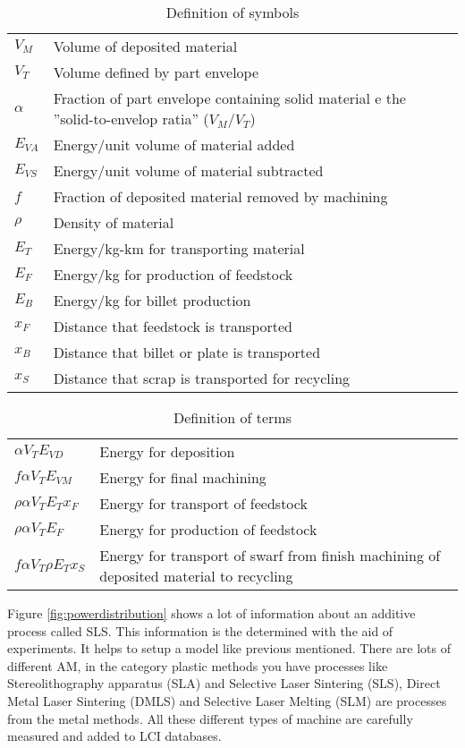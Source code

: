 \begin{table}[H]
\centering
\caption{Definition of symbols \cite{Watson2018}}
\label{table:symbols}
\begin{tabular}{l p{9cm}}
\hline
$ V_M $ & Volume of deposited material   \\
$ V_T $ & Volume defined by part envelope  \\
$ \alpha $ & Fraction of part envelope containing solid material e the ''solid-to-envelop ratia'' ($V_M$/$V_T$)  \\
$ E_{VA} $  & Energy/unit volume of material added   \\
$ E_{VS}$  & Energy/unit volume of material subtracted   \\
$ f $ & Fraction of deposited material removed by machining   \\
$ \rho  $ & Density of material  \\
$ E_T $ & Energy/kg-km for transporting material  \\
$ E_F  $ & Energy/kg for production of feedstock \\
$ E_B  $ & Energy/kg for billet production \\
$ x_F  $ & Distance that feedstock is transported \\
$ x_B  $ & Distance that billet or plate is transported \\
$ x_S  $ & Distance that scrap is transported for recycling \\ \hline
\end{tabular}
\end{table}
\begin{table}[H]
\centering
\caption{Definition of terms \cite{Watson2018}}
\label{table:terms}
\begin{tabular}{l p{9cm}}
\hline
$\alpha V_T E_{VD} $ & Energy for deposition  \\
$ f {\alpha} V_T E_{VM} $ &  Energy for final machining  \\
$ \rho \alpha V_T E_T x_F $ &  Energy for transport of feedstock  \\
$ \rho \alpha V_T E_F $ &  Energy for production of feedstock \\
$ f \alpha V_T \rho E_T x_S $ &  Energy for transport of swarf  from finish machining of deposited material to recycling \\ \hline
\end{tabular}
\end{table}


Figure \ref{fig:powerdistribution}  shows a lot of information about an additive process called SLS. This information is the determined with the aid of experiments. It helps to setup a model like previous mentioned. There are lots of different AM, in the category plastic methods you have processes like Stereolithography apparatus (SLA) and Selective Laser Sintering (SLS), Direct Metal Laser Sintering (DMLS) and Selective Laser Melting (SLM) are processes from the metal methods. All these different types of machine are carefully measured and added to LCI databases.

